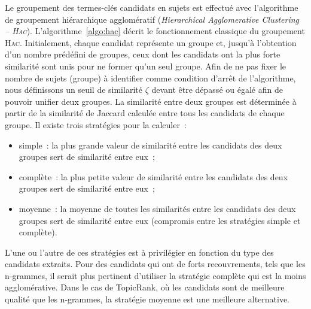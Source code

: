         Le groupement des termes-clés candidats en sujets est effectué avec
        l'algorithme de groupement hiérarchique agglomératif
        (\textit{Hierarchical Agglomerative Clustering -- \textsc{Hac}}).
        L'algorithme~\ref{algo:hac} décrit le fonctionnement classique du
        groupement \textsc{Hac}. Initialement, chaque candidat représente un
        groupe et, jusqu'à l'obtention d'un nombre prédéfini de groupes, ceux
        dont les candidats ont la plus forte similarité sont unis pour ne former
        qu'un seul groupe. Afin de ne pas fixer le nombre de sujets (groupe) à
        identifier comme condition d'arrêt de l'algorithme, nous définissons un
        seuil de similarité $\zeta$ devant être dépassé ou égalé afin de pouvoir
        unifier deux groupes. La similarité entre deux groupes est déterminée à
        partir de la similarité de Jaccard calculée entre tous les candidats de
        chaque groupe. Il existe trois stratégies pour la calculer~:
        \begin{itemize}
          \item{simple~: la plus grande valeur de similarité entre les candidats
                des deux groupes sert de similarité entre eux~;}
          \item{complète~: la plus petite valeur de similarité entre les
                candidats des deux groupes sert de similarité entre eux~;}
          \item{moyenne~: la moyenne de toutes les similarités entre les
                candidats des deux groupes sert de similarité entre eux
                (compromis entre les stratégies simple et complète).}
        \end{itemize}
        L'une ou l'autre de ces stratégies est à privilégier en fonction du type
        des candidats extraits. Pour des candidats qui ont de forts
        recouvrements, tels que les n-grammes, il serait plus pertinent
        d'utiliser la stratégie complète qui est la moins agglomérative. Dans le
        cas de TopicRank, où les candidats sont de meilleure qualité que les
        n-grammes, la stratégie moyenne est une meilleure alternative.
